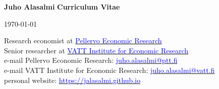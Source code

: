 \documentclass[16pt]{article}
\begin{document}
\noindent \textbf{Juho Alasalmi} \hfill{\textbf{Curriculum Vitae}} \par
\noindent  \hfill{\today} \par

\noindent Research economist at \href{http://www.ptt.fi/}{\textcolor{blue}{Pellervo Economic Research}} \\
\noindent Senior researcher at \href{https://vatt.fi/en/frontpage}{\textcolor{blue}{VATT Institute for Economic Research}} \\

\noindent e-mail Pellervo Economic Research: \href{mailto: juho.alasalmi@ptt.fi}{\textcolor{blue}{juho.alasalmi@ptt.fi}}\\
\noindent e-mail VATT Institute for Economic Research: \href{mailto: juho.alasalmi@vatt.fi}{\textcolor{blue}{juho.alasalmi@vatt.fi}}\\
\noindent personal website: \href{https://jalasalmi.github.io}{\textcolor{blue}{https://jalasalmi.github.io}}

%
\end{document}
